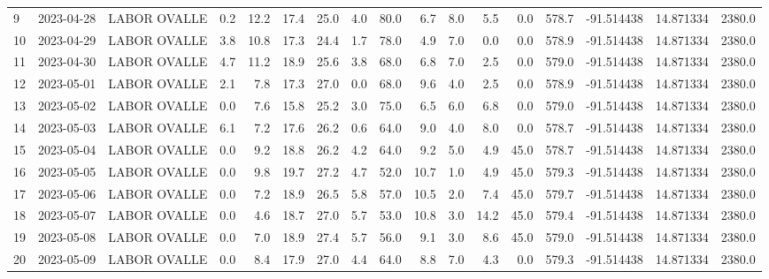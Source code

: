 \documentclass[12pt]{article}
\begin{document}
\begin{center}
\begin{tabular}{lllrrrrrrrrrrrrrr}
9   & 2023-04-28 &  LABOR OVALLE &     0.2 &  12.2 &   17.4 &  25.0 &      4.0 &     80.0 &        6.7 &  8.0 &         5.5 &         0.0 &      578.7 & -91.514438 &  14.871334 &   2380.0 \\
10  & 2023-04-29 &  LABOR OVALLE &     3.8 &  10.8 &   17.3 &  24.4 &      1.7 &     78.0 &        4.9 &  7.0 &         0.0 &         0.0 &      578.9 & -91.514438 &  14.871334 &   2380.0 \\
11  & 2023-04-30 &  LABOR OVALLE &     4.7 &  11.2 &   18.9 &  25.6 &      3.8 &     68.0 &        6.8 &  7.0 &         2.5 &         0.0 &      579.0 & -91.514438 &  14.871334 &   2380.0 \\
12  & 2023-05-01 &  LABOR OVALLE &     2.1 &   7.8 &   17.3 &  27.0 &      0.0 &     68.0 &        9.6 &  4.0 &         2.5 &         0.0 &      578.9 & -91.514438 &  14.871334 &   2380.0 \\
13  & 2023-05-02 &  LABOR OVALLE &     0.0 &   7.6 &   15.8 &  25.2 &      3.0 &     75.0 &        6.5 &  6.0 &         6.8 &         0.0 &      579.0 & -91.514438 &  14.871334 &   2380.0 \\
14  & 2023-05-03 &  LABOR OVALLE &     6.1 &   7.2 &   17.6 &  26.2 &      0.6 &     64.0 &        9.0 &  4.0 &         8.0 &         0.0 &      578.7 & -91.514438 &  14.871334 &   2380.0 \\
15  & 2023-05-04 &  LABOR OVALLE &     0.0 &   9.2 &   18.8 &  26.2 &      4.2 &     64.0 &        9.2 &  5.0 &         4.9 &        45.0 &      578.7 & -91.514438 &  14.871334 &   2380.0 \\
16  & 2023-05-05 &  LABOR OVALLE &     0.0 &   9.8 &   19.7 &  27.2 &      4.7 &     52.0 &       10.7 &  1.0 &         4.9 &        45.0 &      579.3 & -91.514438 &  14.871334 &   2380.0 \\
17  & 2023-05-06 &  LABOR OVALLE &     0.0 &   7.2 &   18.9 &  26.5 &      5.8 &     57.0 &       10.5 &  2.0 &         7.4 &        45.0 &      579.7 & -91.514438 &  14.871334 &   2380.0 \\
18  & 2023-05-07 &  LABOR OVALLE &     0.0 &   4.6 &   18.7 &  27.0 &      5.7 &     53.0 &       10.8 &  3.0 &        14.2 &        45.0 &      579.4 & -91.514438 &  14.871334 &   2380.0 \\
19  & 2023-05-08 &  LABOR OVALLE &     0.0 &   7.0 &   18.9 &  27.4 &      5.7 &     56.0 &        9.1 &  3.0 &         8.6 &        45.0 &      579.0 & -91.514438 &  14.871334 &   2380.0 \\
20  & 2023-05-09 &  LABOR OVALLE &     0.0 &   8.4 &   17.9 &  27.0 &      4.4 &     64.0 &        8.8 &  7.0 &         4.3 &         0.0 &      579.3 & -91.514438 &  14.871334 &   2380.0 \\

\end{tabular}
\end{center}
\end{document}
